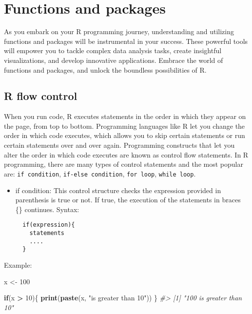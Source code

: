 \documentclass[
]{book}
\newenvironment{Shaded}{\begin{snugshade}}{\end{snugshade}}
\newcommand{\CommentTok}[1]{\textcolor[rgb]{0.56,0.35,0.01}{\textit{#1}}}
\newcommand{\ControlFlowTok}[1]{\textcolor[rgb]{0.13,0.29,0.53}{\textbf{#1}}}
\newcommand{\DecValTok}[1]{\textcolor[rgb]{0.00,0.00,0.81}{#1}}
\newcommand{\FunctionTok}[1]{\textcolor[rgb]{0.13,0.29,0.53}{\textbf{#1}}}
\newcommand{\NormalTok}[1]{#1}
\newcommand{\OtherTok}[1]{\textcolor[rgb]{0.56,0.35,0.01}{#1}}
\newcommand{\SpecialCharTok}[1]{\textcolor[rgb]{0.81,0.36,0.00}{\textbf{#1}}}
\newcommand{\StringTok}[1]{\textcolor[rgb]{0.31,0.60,0.02}{#1}}
\begin{document}
\hypertarget{functions-and-packages}{%
\chapter{Functions and packages}\label{functions-and-packages}}

As you embark on your R programming journey, understanding and utilizing functions and packages will be instrumental in your success. These powerful tools will empower you to tackle complex data analysis tasks, create insightful visualizations, and develop innovative applications. Embrace the world of functions and packages, and unlock the boundless possibilities of R.

\hypertarget{r-flow-control}{%
\section{R flow control}\label{r-flow-control}}

When you run code, R executes statements in the order in which they appear on the page, from top to bottom. Programming languages like R let you change the order in which code executes, which allows you to skip certain statements or run certain statements over and over again. Programming constructs that let you alter the order in which code executes are known as control flow statements. In R programming, there are many types of control statements and the most popular are: \texttt{if\ condition}, \texttt{if-else\ condition}, \texttt{for\ loop}, \texttt{while\ loop}.

\begin{itemize}
\item
  if condition: This control structure checks the expression provided in parenthesis is true or not. If true, the execution of the statements in braces \{\} continues.
  Syntax:

\begin{verbatim}
  if(expression){
    statements
    ....
  }
\end{verbatim}
\end{itemize}

Example:

\begin{Shaded}
\begin{Highlighting}[]
\NormalTok{x }\OtherTok{\textless{}{-}} \DecValTok{100}

\ControlFlowTok{if}\NormalTok{(x }\SpecialCharTok{\textgreater{}} \DecValTok{10}\NormalTok{)\{ }
  \FunctionTok{print}\NormalTok{(}\FunctionTok{paste}\NormalTok{(x, }\StringTok{"is greater than 10"}\NormalTok{))}
\NormalTok{\}}
\CommentTok{\#\textgreater{} [1] "100 is greater than 10"}
\end{Highlighting}
\end{Shaded}
\end{document}
